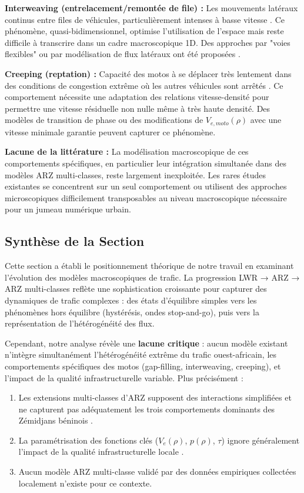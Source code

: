 \textbf{Interweaving (entrelacement/remontée de file) :} Les mouvements latéraux continus entre files de véhicules, particulièrement intenses à basse vitesse \cite{DiFrancescoEtAl2015, TiwariEtAl2007}. Ce phénomène, quasi-bidimensionnel, optimise l'utilisation de l'espace mais reste difficile à transcrire dans un cadre macroscopique 1D. Des approches par "voies flexibles" ou par modélisation de flux latéraux ont été proposées \cite{ColomboMarcelliniRossi2023}.

\textbf{Creeping (reptation) :} Capacité des motos à se déplacer très lentement dans des conditions de congestion extrême où les autres véhicules sont arrêtés \cite{Saumtally2012, FanWork2015}. Ce comportement nécessite une adaptation des relations vitesse-densité pour permettre une vitesse résiduelle non nulle même à très haute densité. Des modèles de transition de phase ou des modifications de $V_{e,moto}(\rho)$ avec une vitesse minimale garantie peuvent capturer ce phénomène.

\textbf{Lacune de la littérature :} La modélisation macroscopique de ces comportements spécifiques, en particulier leur intégration simultanée dans des modèles ARZ multi-classes, reste largement inexploitée. Les rares études existantes se concentrent sur un seul comportement ou utilisent des approches microscopiques difficilement transposables au niveau macroscopique nécessaire pour un jumeau numérique urbain.

\subsection{Synthèse de la Section}
Cette section a établi le positionnement théorique de notre travail en examinant l'évolution des modèles macroscopiques de trafic. La progression LWR → ARZ → ARZ multi-classes reflète une sophistication croissante pour capturer des dynamiques de trafic complexes : des états d'équilibre simples vers les phénomènes hors équilibre (hystérésis, ondes stop-and-go), puis vers la représentation de l'hétérogénéité des flux.

Cependant, notre analyse révèle une \textbf{lacune critique} : aucun modèle existant n'intègre simultanément l'hétérogénéité extrême du trafic ouest-africain, les comportements spécifiques des motos (gap-filling, interweaving, creeping), et l'impact de la qualité infrastructurelle variable. Plus précisément :

\begin{enumerate}
    \item Les extensions multi-classes d'ARZ supposent des interactions simplifiées et ne capturent pas adéquatement les trois comportements dominants des Zémidjans béninois \cite{Saumtally2012}.
    \item La paramétrisation des fonctions clés ($V_e(\rho)$, $p(\rho)$, $\tau$) ignore généralement l'impact de la qualité infrastructurelle locale \cite{JollyEtAl2005}.
    \item Aucun modèle ARZ multi-classe validé par des données empiriques collectées localement n'existe pour ce contexte.
\end{enumerate}

